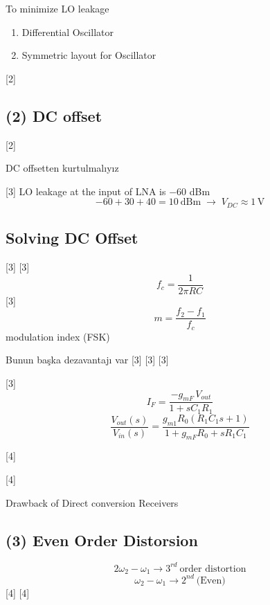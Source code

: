 \documentclass[11pt,a4paper]{article}
\begin{document}
To minimize LO leakage
\begin{enumerate}[label=\arabic*)]
\item Differential Oscillator
\item Symmetric layout for Oscillator
\end{enumerate}
[2]

\subsection{(2) DC offset}
[2]

DC offsetten kurtulmalıyız

\begin{ornek}
[3]
LO leakage at the input of LNA is $-60$ dBm
\[ -60 + 30 + 40 = 10\ \mathrm{dBm} \;\rightarrow\; V_{DC} \approx 1\,\mathrm{V} \]
\end{ornek}

\subsection{Solving DC Offset}
[3]
[3]
\[ f_c = \frac{1}{2\pi R C} \]
[3]
\[ m = \frac{f_2 - f_1}{f_c} \]
modulation index (FSK)

Bunun başka dezavantajı var
[3]
[3]
[3]

\begin{cozum}[1]
[3]
\[ I_F = \frac{-g_{mF}\,V_{out}}{1 + sC_1R_1} \]
\[ \frac{V_{out}(s)}{V_{in}(s)} = \frac{g_{m1}R_0(R_1C_1 s + 1)}{1 + g_{mF}R_0 + sR_1C_1} \]
\end{cozum}

[4]

\begin{cozum}[2]
[4]
\end{cozum}

Drawback of Direct conversion Receivers

\subsection{(3) Even Order Distorsion}
\[ 2\omega_2 - \omega_1 \rightarrow 3^{rd}\ \text{order distortion} \]
\[ \omega_2 - \omega_1 \rightarrow 2^{nd}\ \text{(Even)} \]
[4]
[4]
\end{document}

